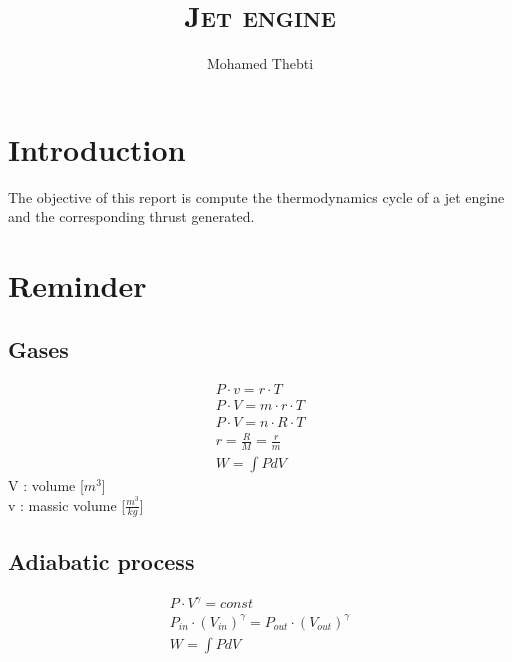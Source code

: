 \documentclass[12pt,a4paper]{article}
\title{
\Huge\textsc{Jet engine}
}
\author{Mohamed Thebti}
\begin{document}
\setlength{\parindent}{0mm}

\fancyhead[R]{\slshape \leftmark}

\fancyfoot[C]{}
\fancyfoot[R]{\thepage}

\maketitle
\newpage

\tableofcontents

\newpage



\section{Introduction}

The objective of this report is compute the thermodynamics cycle of a jet engine and the corresponding thrust generated.


\section{Reminder}
\subsection{Gases}
    \begin{eqnarray}
    P \cdot v= r \cdot T\\
    P \cdot V= m \cdot r \cdot T\\
    P \cdot V= n \cdot R \cdot T\\
    r = \frac{R}{M} = \frac{r}{m}\\
    W =\int P dV
\end{eqnarray}
V : volume [$m^3$] \\
v : massic volume [$\frac{m^3}{kg}$]
\subsection{Adiabatic process}

\begin{eqnarray}
    P \cdot V^{\gamma} = const\\
    P_{in} \cdot (V_{in})^{\gamma} = P_{out} \cdot (V_{out})^{\gamma}\\
    W =\int P dV
\end{eqnarray}
\end{document}
